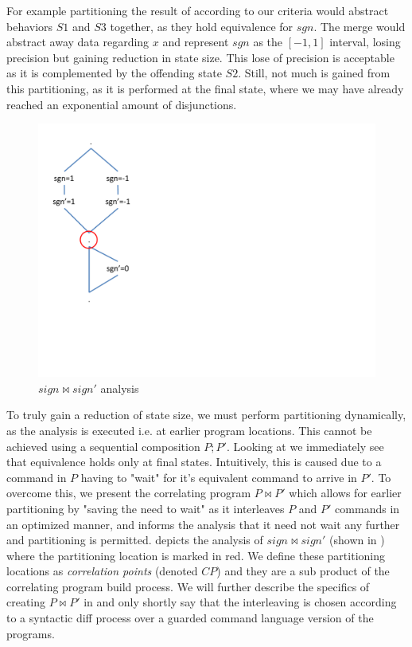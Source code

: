 For example partitioning the result of  according to our criteria would abstract behaviors $S1$ and $S3$ together, as they hold equivalence for $sgn$. The merge would abstract away data regarding $x$ and represent $sgn$ as the $[-1,1]$ interval, losing precision but gaining reduction in state size. This lose of precision is acceptable as it is complemented by the offending state $S2$. Still, not much is gained from this partitioning, as it is performed at the final state, where we may have already reached an exponential amount of disjunctions.

\begin{figure}
\centering
\includegraphics[scale=0.42,clip=true,trim = 0pt 150pt 450pt 150pt]{figures/sign-graph-correlated}
\caption{$sign \bowtie sign'$ analysis}
\end{figure}

To truly gain a reduction of state size, we must perform partitioning dynamically, as the analysis is executed i.e. at earlier program locations. This cannot be achieved using a sequential composition $P;P'$. Looking at  we immediately see that equivalence holds only at final states. Intuitively, this is caused due to a command in $P$ having to "wait" for it's equivalent command to arrive in $P'$. To overcome this, we present the correlating program $P \bowtie P'$ which allows for earlier partitioning by "saving the need to wait" as it interleaves $P$ and $P'$ commands in an optimized manner, and informs the analysis that it need not wait any further and partitioning is permitted.  depicts the analysis of $sign \bowtie sign'$ (shown in ) where the partitioning location is marked in red. We define these partitioning locations as \emph{correlation points} (denoted $CP$) and they are a sub product of the correlating program build process. We will further describe the specifics of creating $P \bowtie P'$ in  and only shortly say that the interleaving is chosen according to a syntactic diff process over a guarded command language version of the programs.

